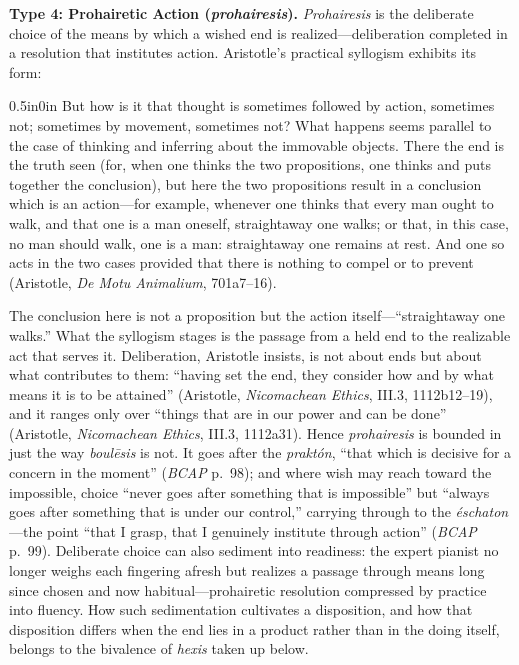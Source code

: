 \textbf{Type 4: Prohairetic Action (\textit{prohairesis}).} \textit{Prohairesis} is the deliberate choice of the means by which a wished end is realized---deliberation completed in a resolution that institutes action. Aristotle's practical syllogism exhibits its form:

\begin{adjustwidth}{0.5in}{0in}
But how is it that thought is sometimes followed by action, sometimes not; sometimes by movement, sometimes not? What happens seems parallel to the case of thinking and inferring about the immovable objects. There the end is the truth seen (for, when one thinks the two propositions, one thinks and puts together the conclusion), but here the two propositions result in a conclusion which is an action---for example, whenever one thinks that every man ought to walk, and that one is a man oneself, straightaway one walks; or that, in this case, no man should walk, one is a man: straightaway one remains at rest. And one so acts in the two cases provided that there is nothing to compel or to prevent (Aristotle, \textit{De Motu Animalium}, 701a7--16).
\end{adjustwidth}

The conclusion here is not a proposition but the action itself---``straightaway one walks.'' What the syllogism stages is the passage from a held end to the realizable act that serves it. Deliberation, Aristotle insists, is not about ends but about what contributes to them: ``having set the end, they consider how and by what means it is to be attained'' (Aristotle, \textit{Nicomachean Ethics}, III.3, 1112b12--19), and it ranges only over ``things that are in our power and can be done'' (Aristotle, \textit{Nicomachean Ethics}, III.3, 1112a31). Hence \textit{prohairesis} is bounded in just the way \textit{boulēsis} is not. It goes after the \textit{praktón}, ``that which is decisive for a concern in the moment'' (\textit{BCAP} p.~98); and where wish may reach toward the impossible, choice ``never goes after something that is impossible'' but ``always goes after something that is under our control,'' carrying through to the \textit{éschaton}---the point ``that I grasp, that I genuinely institute through action'' (\textit{BCAP} p.~99). Deliberate choice can also sediment into readiness: the expert pianist no longer weighs each fingering afresh but realizes a passage through means long since chosen and now habitual---prohairetic resolution compressed by practice into fluency. How such sedimentation cultivates a disposition, and how that disposition differs when the end lies in a product rather than in the doing itself, belongs to the bivalence of \textit{hexis} taken up below.

